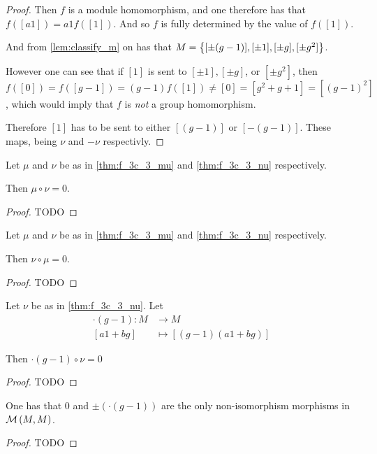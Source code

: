 \begin{proof}
    Then \( f \) is a module homomorphism, and one therefore has that \( f([a1]) = a1 f([1]) \). And so \( f \) is fully determined by the value of \( f([1]) \). 
    
    And from \autoref{lem:classify_m} on has that \( M = \left\{ [\pm (g - 1)], [\pm 1], [\pm g], [\pm g^2] \right\} \).

    However one can see that if \( [1] \) is sent to \( [\pm 1], [\pm g] \), or \( [\pm g^2] \), then \( f([0]) = f([g - 1]) = (g - 1)f([1]) \neq [0] = [g^2 + g + 1] = [(g - 1)^2] \), which would imply that \( f \) is \emph{not} a group homomorphism.

    Therefore \( [1] \) has to be sent to either \( [(g - 1)] \) or \( [-(g - 1)] \). These maps, being \( \nu \) and \( -\nu \) respectivly.
\end{proof}

\begin{lemma} \label{thm:f_3c_3_mu_circ_nu_zero}
    Let \( \mu \) and \( \nu \) be as in \autoref{thm:f_3c_3_mu} and \autoref{thm:f_3c_3_nu} respectively.

    Then \( \mu \circ \nu = 0 \).
\end{lemma}
\begin{proof}
    TODO
\end{proof}

\begin{lemma} \label{thm:f_3c_3_nu_circ_mu_zero}
    Let \( \mu \) and \( \nu \) be as in \autoref{thm:f_3c_3_mu} and \autoref{thm:f_3c_3_nu} respectively.

    Then \( \nu \circ \mu = 0 \).
\end{lemma}
\begin{proof}
    TODO
\end{proof}

\begin{lemma} \label{lem:g-1_circ_nu_equals_zero}
    Let \( \nu \) be as in \autoref{thm:f_3c_3_nu}. Let
    \begin{align*}
        \cdot(g - 1): M &\to M \\
        [a1 + bg] &\mapsto [(g - 1)(a1 + bg)]
    \end{align*}

    Then \( \cdot(g - 1) \circ \nu = 0 \) 
\end{lemma}
\begin{proof}
    TODO
\end{proof}

\begin{lemma} \label{lem:only_non_surjective_M_to_M}
    One has that \( 0 \) and \( \pm(\cdot(g - 1)) \) are the only non-isomorphism morphisms in \( {\mathcal{M}}\left( M, M \right) \).
\end{lemma}
\begin{proof}
    TODO
\end{proof}

